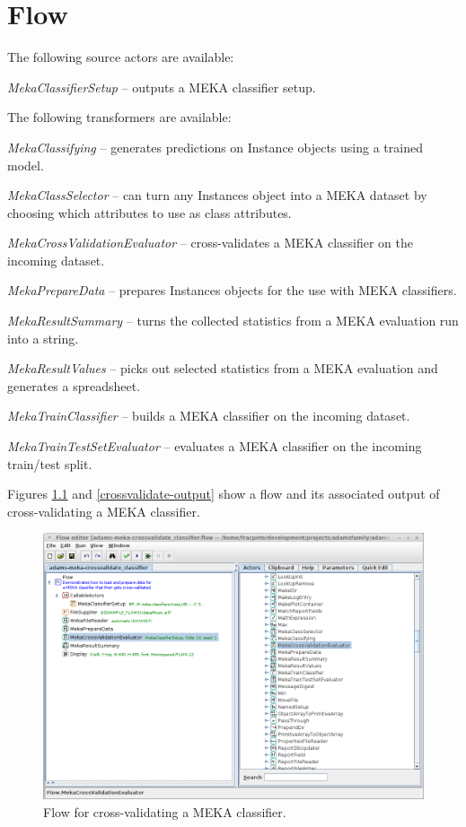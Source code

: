 \documentclass[a4paper]{book}
\begin{document}
\chapter{Flow}
The following source actors are available:
\begin{tight_itemize}
	\item \textit{MekaClassifierSetup} -- outputs a MEKA classifier setup.
\end{tight_itemize}
The following transformers are available:
\begin{tight_itemize}
	\item \textit{MekaClassifying} -- generates predictions on Instance objects
	using a trained model.
	\item \textit{MekaClassSelector} -- can turn any Instances object into
	a MEKA dataset by choosing which attributes to use as class attributes.
	\item \textit{MekaCrossValidationEvaluator} -- cross-validates a MEKA 
	classifier on the incoming dataset.
	\item \textit{MekaPrepareData} -- prepares Instances objects for the 
	use with MEKA classifiers.
	\item \textit{MekaResultSummary} -- turns the collected statistics from
	a MEKA evaluation run into a string.
	\item \textit{MekaResultValues} -- picks out selected statistics from a
	MEKA evaluation and	generates a spreadsheet.
	\item \textit{MekaTrainClassifier} -- builds a MEKA classifier on the
	incoming dataset.
	\item \textit{MekaTrainTestSetEvaluator} -- evaluates a MEKA classifier
	on the incoming train/test split.
\end{tight_itemize}

\newpage
Figures \ref{crossvalidate-flow} and \ref{crossvalidate-output} show a flow
and its associated output of cross-validating a MEKA classifier.

\begin{figure}[htb]
  \centering
  \includegraphics[width=12.0cm]{images/crossvalidate-flow.png}
  \caption{Flow for cross-validating a MEKA classifier.}
  \label{crossvalidate-flow}
\end{figure}
\end{document}
